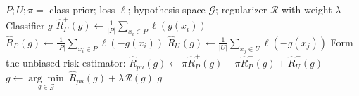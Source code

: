 \documentclass{article}
\begin{document}
\begin{algorithm}[!h]
\renewcommand{\algorithmicrequire}{\textbf{Input:}} %
\renewcommand{\algorithmicensure}{\textbf{Output:}} %
	\caption{uPU (unbiased PU learning)} %
	\begin{algorithmic}[1] %
	    \REQUIRE
	    $P;U;\pi=$ class prior; loss $\ell$; hypothesis space $\mathcal{G}$; regularizer $\mathcal{R}$ with weight $\lambda$
	    \ENSURE
	    Classifier $g$
	    \STATE $\hat{R}_{P}^{+}(g)\leftarrow \frac{1}{|P|}\sum_{x_i\in P}\ell(g(x_i))$ %
	    \STATE $\hat{R}_{P}^{-}(g)\leftarrow \frac{1}{|P|}\sum_{x_i\in P}\ell(-g(x_i))$
	    \STATE $\hat{R}_{U}^{-}(g)\leftarrow \frac{1}{|U|}\sum_{x_j\in U}\ell(-g(x_j))$
	    \STATE Form the unbiased risk estimator: %
	    \STATE $\hat{R}_{pu}(g)\leftarrow \pi \hat{R}_{P}^{+}(g)-\pi \hat{R}_{P}^{-}(g)+\hat{R}_{U}^{-}(g)$
	    \STATE $g\leftarrow \underset{g\in \mathcal{G}}{\arg\min}\ \hat{R}_{pu}(g)+\lambda \mathcal{R}(g)$
		\RETURN $g$
	\end{algorithmic}
\end{algorithm}
\end{document}
